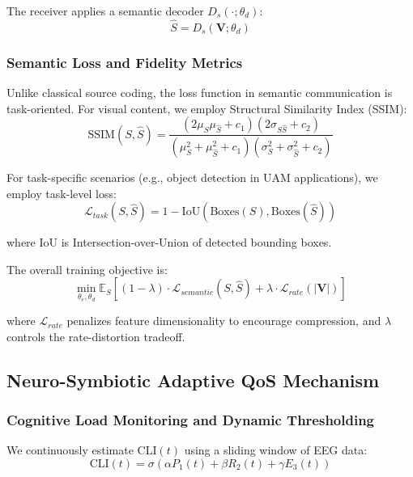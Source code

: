 \documentclass[journal]{IEEEtran}
\begin{document}
The receiver applies a semantic decoder $D_s(\cdot; \theta_d)$:
\begin{equation}
    \hat{S} = D_s(\mathbf{V}; \theta_d)
\end{equation}

\subsubsection{Semantic Loss and Fidelity Metrics}
Unlike classical source coding, the loss function in semantic communication is task-oriented. For visual content, we employ Structural Similarity Index (SSIM):
\begin{equation}
    \text{SSIM}(S, \hat{S}) = \frac{(2\mu_S\mu_{\hat{S}} + c_1)(2\sigma_{S\hat{S}} + c_2)}{(\mu_S^2 + \mu_{\hat{S}}^2 + c_1)(\sigma_S^2 + \sigma_{\hat{S}}^2 + c_2)}
\end{equation}

For task-specific scenarios (e.g., object detection in UAM applications), we employ task-level loss:
\begin{equation}
    \mathcal{L}_{task}(S, \hat{S}) = 1 - \text{IoU}(\text{Boxes}(S), \text{Boxes}(\hat{S}))
\end{equation}

where IoU is Intersection-over-Union of detected bounding boxes.

The overall training objective is:
\begin{equation}
    \min_{\theta_e, \theta_d} \mathbb{E}_S \left[ (1-\lambda) \cdot \mathcal{L}_{semantic}(S, \hat{S}) + \lambda \cdot \mathcal{L}_{rate}(|\mathbf{V}|) \right]
\end{equation}

where $\mathcal{L}_{rate}$ penalizes feature dimensionality to encourage compression, and $\lambda$ controls the rate-distortion tradeoff.

\subsection{Neuro-Symbiotic Adaptive QoS Mechanism}

\subsubsection{Cognitive Load Monitoring and Dynamic Thresholding}
We continuously estimate CLI$(t)$ using a sliding window of EEG data:
\begin{equation}
    \text{CLI}(t) = \sigma\left( \alpha P_1(t) + \beta R_2(t) + \gamma E_3(t) \right)
\end{equation}
\end{document}
